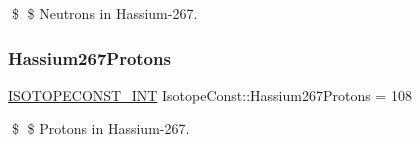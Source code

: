 \$ \$ Neutrons in Hassium-\/267. \mbox{\label{group___isotope_const-_hassium-_hs267_gaf7d214158875da7b1c4db3eb0be34f28}} 
\subsubsection{\texorpdfstring{Hassium267\+Protons}{Hassium267Protons}}
{\footnotesize\ttfamily \mbox{\hyperlink{group___isotope_const-_macros_ga5f18360b3e99483a35c32d789e62621c}{I\+S\+O\+T\+O\+P\+E\+C\+O\+N\+S\+T\+\_\+\+I\+NT}} Isotope\+Const\+::\+Hassium267\+Protons = 108}

\$ \$ Protons in Hassium-\/267. 